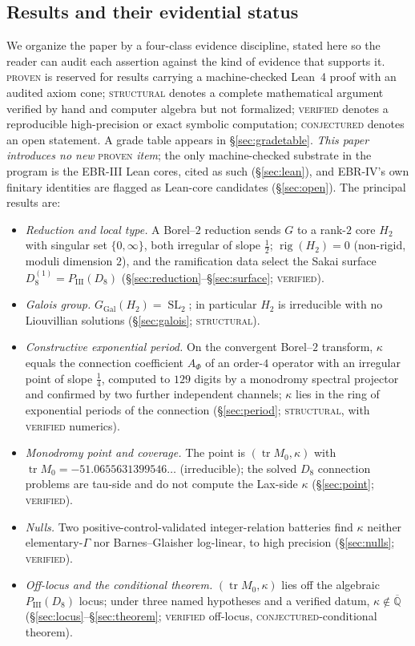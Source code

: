 \documentclass[11pt,reqno]{amsart}
\theoremstyle{plain}
\theoremstyle{definition}
\theoremstyle{remark}
\newcommand{\Q}{\mathbb{Q}}
\newcommand{\Qbar}{\overline{\Q}}
\newcommand{\GGal}{G_{\mathrm{Gal}}}
\newcommand{\SL}{\operatorname{SL}}
\newcommand{\tr}{\operatorname{tr}}
\DeclareMathOperator{\rig}{rig}
\newcommand{\Htwo}{H_{2}}
\newcommand{\PIII}{P_{\mathrm{III}}}
\begin{document}
\subsection{Results and their evidential status}\label{sec:grades}
We organize the paper by a four-class evidence discipline, stated here so the
reader can audit each assertion against the kind of evidence that supports it.
\textsc{proven} is reserved for results carrying a machine-checked Lean~4 proof
with an audited axiom cone; \textsc{structural} denotes a complete mathematical
argument verified by hand and computer algebra but not formalized;
\textsc{verified} denotes a reproducible high-precision or exact symbolic
computation; \textsc{conjectured} denotes an open statement. A grade table
appears in \S\ref{sec:gradetable}. \emph{This paper introduces no new}
\textsc{proven} \emph{item}; the only machine-checked substrate in the program
is the EBR-III Lean cores, cited as such (\S\ref{sec:lean}), and EBR-IV's own
finitary identities are flagged as Lean-core candidates (\S\ref{sec:open}). The
principal results are:
\begin{itemize}
\item[(R1)] \emph{Reduction and local type.} A Borel--$2$ reduction sends $G$ to
a rank-$2$ core $\Htwo$ with singular set $\{0,\infty\}$, both irregular of
slope $\tfrac12$; $\rig(\Htwo)=0$ (non-rigid, moduli dimension $2$), and the
ramification data select the Sakai surface $D_{8}^{(1)}=\PIII(D_{8})$
(\S\ref{sec:reduction}--\S\ref{sec:surface}; \textsc{verified}).
\item[(R2)] \emph{Galois group.} $\GGal(\Htwo)=\SL_{2}$; in particular $\Htwo$
is irreducible with no Liouvillian solutions (\S\ref{sec:galois};
\textsc{structural}).
\item[(R3)] \emph{Constructive exponential period.} On the convergent Borel--$2$
transform, $\kappa$ equals the connection coefficient $A_{\Phi}$ of an order-$4$
operator with an irregular point of slope $\tfrac14$, computed to $129$ digits
by a monodromy spectral projector and confirmed by two further independent
channels; $\kappa$ lies in the ring of exponential periods of the connection
(\S\ref{sec:period}; \textsc{structural}, with \textsc{verified} numerics).
\item[(R4)] \emph{Monodromy point and coverage.} The point is
$(\tr M_{0},\kappa)$ with $\tr M_{0}=-51.0655631399546\ldots$ (irreducible);
the solved $D_{8}$ connection problems are tau-side and do not compute the
Lax-side $\kappa$ (\S\ref{sec:point}; \textsc{verified}).
\item[(R5)] \emph{Nulls.} Two positive-control-validated integer-relation
batteries find $\kappa$ neither elementary-$\Gamma$ nor Barnes--Glaisher
log-linear, to high precision (\S\ref{sec:nulls}; \textsc{verified}).
\item[(R6)] \emph{Off-locus and the conditional theorem.} $(\tr M_{0},\kappa)$
lies off the algebraic $\PIII(D_{8})$ locus; under three named hypotheses and a
verified datum, $\kappa\notin\Qbar$ (\S\ref{sec:locus}--\S\ref{sec:theorem};
\textsc{verified} off-locus, \textsc{conjectured}-conditional theorem).
\end{itemize}
\end{document}
